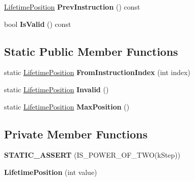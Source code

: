 \begin{DoxyCompactItemize}
\item 
\hyperlink{classv8_1_1internal_1_1_lifetime_position}{Lifetime\+Position} {\bfseries Prev\+Instruction} () const \hypertarget{classv8_1_1internal_1_1_lifetime_position_a8673fbe3f9c1751d76a74920c524948b}{}\label{classv8_1_1internal_1_1_lifetime_position_a8673fbe3f9c1751d76a74920c524948b}

\item 
bool {\bfseries Is\+Valid} () const \hypertarget{classv8_1_1internal_1_1_lifetime_position_aba12f6295305aaee8e589f5a158e1d00}{}\label{classv8_1_1internal_1_1_lifetime_position_aba12f6295305aaee8e589f5a158e1d00}

\end{DoxyCompactItemize}
\subsection*{Static Public Member Functions}
\begin{DoxyCompactItemize}
\item 
static \hyperlink{classv8_1_1internal_1_1_lifetime_position}{Lifetime\+Position} {\bfseries From\+Instruction\+Index} (int index)\hypertarget{classv8_1_1internal_1_1_lifetime_position_ac4b9a791bc55646e45284a74d932dd6b}{}\label{classv8_1_1internal_1_1_lifetime_position_ac4b9a791bc55646e45284a74d932dd6b}

\item 
static \hyperlink{classv8_1_1internal_1_1_lifetime_position}{Lifetime\+Position} {\bfseries Invalid} ()\hypertarget{classv8_1_1internal_1_1_lifetime_position_aa06cda95a32c3b1a18ed08d82daacb8a}{}\label{classv8_1_1internal_1_1_lifetime_position_aa06cda95a32c3b1a18ed08d82daacb8a}

\item 
static \hyperlink{classv8_1_1internal_1_1_lifetime_position}{Lifetime\+Position} {\bfseries Max\+Position} ()\hypertarget{classv8_1_1internal_1_1_lifetime_position_a26a6570b7b12c52d5e301f1c55c6780c}{}\label{classv8_1_1internal_1_1_lifetime_position_a26a6570b7b12c52d5e301f1c55c6780c}

\end{DoxyCompactItemize}
\subsection*{Private Member Functions}
\begin{DoxyCompactItemize}
\item 
{\bfseries S\+T\+A\+T\+I\+C\+\_\+\+A\+S\+S\+E\+RT} (I\+S\+\_\+\+P\+O\+W\+E\+R\+\_\+\+O\+F\+\_\+\+T\+WO(k\+Step))\hypertarget{classv8_1_1internal_1_1_lifetime_position_aa0b46ce30eb443d1540b7faeb86208fe}{}\label{classv8_1_1internal_1_1_lifetime_position_aa0b46ce30eb443d1540b7faeb86208fe}

\item 
{\bfseries Lifetime\+Position} (int value)\hypertarget{classv8_1_1internal_1_1_lifetime_position_aa7501be5768fdfba7210d8f8e609b4d2}{}\label{classv8_1_1internal_1_1_lifetime_position_aa7501be5768fdfba7210d8f8e609b4d2}

\end{DoxyCompactItemize}
